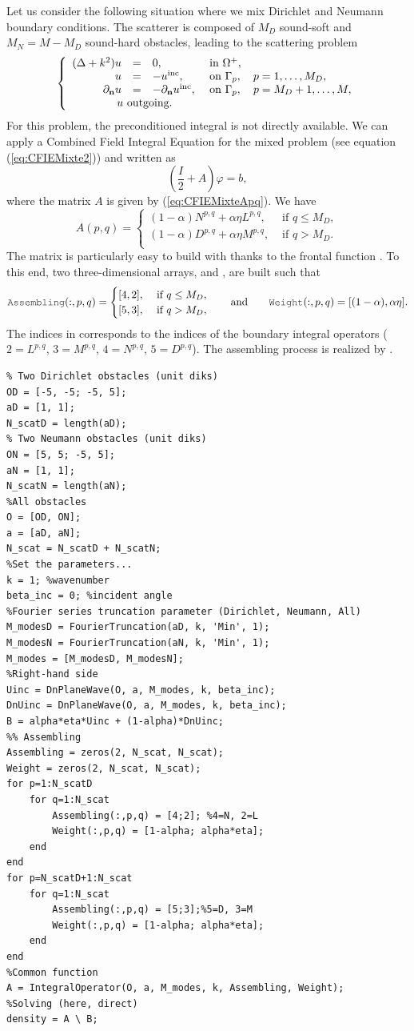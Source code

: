 Let us consider the following situation where we mix Dirichlet and Neumann boundary conditions. The scatterer is composed of
 $M_D$ sound-soft and  $M_N = M-M_D$ sound-hard obstacles, leading to the scattering problem
$$
\left\{\begin{array}{r c l l}
(\Delta +k^2)u & = & 0, & \text{ in }\Omegaps,\\
u & = & -\uinc, & \text{ on }\Gamma_p,\quad p=1,\ldots, M_D,\\
\dn u & = & -\dn \uinc, & \text{ on }\Gamma_p,\quad p=M_D+1,\ldots, M,\\
\multicolumn{4}{l}{\qquad \qquad u \text{ outgoing}.}
\end{array}\right.
$$
For this problem, the  preconditioned integral is not directly available. We can apply a Combined Field Integral Equation for the mixed problem
 (see equation (\ref{eq:CFIEMixte2})) and written as $$(\frac{I}{2} +A)\varphi = b,$$ where
  the matrix $A$ is
  given by  (\ref{eq:CFIEMixteApq}). We have
$$
A(p,q) = 
\begin{cases}
(1-\alpha) N^{p,q} + \alpha\eta L^{p,q}, & \text{ if } q \leq M_D,\\
(1-\alpha) D^{p,q} + \alpha\eta M^{p,q}, & \text{ if } q > M_D.\\
\end{cases}
$$
The  matrix is particularly easy to build  with \mudiff thanks to the frontal function \IntegralOperator. To this end, two
 three-dimensional arrays,  and , are built such that
$$
\code{Assembling}(:, p,q) = 
\begin{cases}
[4,2], & \text{ if } q \leq M_D,\\
[5,3], & \text{ if } q > M_D,
\end{cases}\qquad\text{and}\qquad
\code{Weight}(:, p,q) = [(1-\alpha), \alpha\eta].
$$
The indices in  corresponds to the indices of the boundary integral operators ($2=L^{p,q}$, $3=M^{p,q}$, $4=N^{p,q}$, $5=D^{p,q}$). The assembling process is realized by \IntegralOperator.
\begin{lstlisting}
% Two Dirichlet obstacles (unit diks)
OD = [-5, -5; -5, 5];
aD = [1, 1];
N_scatD = length(aD);
% Two Neumann obstacles (unit diks)
ON = [5, 5; -5, 5];
aN = [1, 1];
N_scatN = length(aN);
%All obstacles
O = [OD, ON];
a = [aD, aN];
N_scat = N_scatD + N_scatN;
%Set the parameters...
k = 1; %wavenumber
beta_inc = 0; %incident angle
%Fourier series truncation parameter (Dirichlet, Neumann, All)
M_modesD = FourierTruncation(aD, k, 'Min', 1);
M_modesN = FourierTruncation(aN, k, 'Min', 1);
M_modes = [M_modesD, M_modesN];
%Right-hand side
Uinc = DnPlaneWave(O, a, M_modes, k, beta_inc);
DnUinc = DnPlaneWave(O, a, M_modes, k, beta_inc);
B = alpha*eta*Uinc + (1-alpha)*DnUinc;
%% Assembling
Assembling = zeros(2, N_scat, N_scat);
Weight = zeros(2, N_scat, N_scat);
for p=1:N_scatD
	for q=1:N_scat
		Assembling(:,p,q) = [4;2]; %4=N, 2=L
		Weight(:,p,q) = [1-alpha; alpha*eta];
	end
end
for p=N_scatD+1:N_scat
	for q=1:N_scat
		Assembling(:,p,q) = [5;3];%5=D, 3=M
		Weight(:,p,q) = [1-alpha; alpha*eta];
	end
end
%Common function
A = IntegralOperator(O, a, M_modes, k, Assembling, Weight);
%Solving (here, direct)
density = A \ B;
\end{lstlisting}
\medskip

